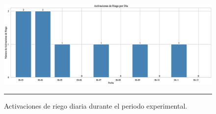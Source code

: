 \documentclass[pdflatex,sn-mathphys-num]{sn-jnl}%
\theoremstyle{thmstyleone}%
\theoremstyle{thmstyletwo}%
\theoremstyle{thmstylethree}%
\begin{document}
\begin{figure}[!h]
    \centering
    \includegraphics[width=1\textwidth]{assets/activaciones_riego_diarias.eps}
    \caption{Activaciones de riego diaria durante el periodo experimental.}
    \label{fig:activaciones_riego_diarias}

    \vspace{0.4cm}

    \noindent
    \begin{minipage}[t]{0.45\textwidth}
        \justifying
	\end{minipage}%
    \hfill
    \begin{minipage}[t]{0.45\textwidth}
        \justifying

\end{minipage}

    \vspace{0.5cm}
    \hrule
\end{figure}

\newpage
\end{document}
